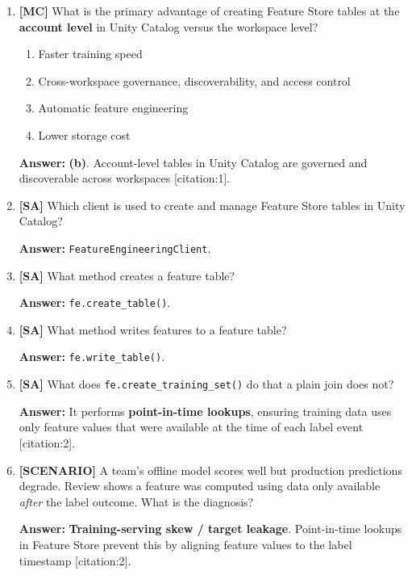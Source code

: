 \documentclass[11pt]{article}
\begin{document}
	\begin{enumerate}[leftmargin=*, label=\textbf{Q\arabic*.}]
		
		\item \textbf{[MC]} What is the primary advantage of creating Feature Store tables at the \textbf{account level} in Unity Catalog versus the workspace level?
		\begin{enumerate}[label=(\alph*)]
			\item Faster training speed
			\item Cross-workspace governance, discoverability, and access control
			\item Automatic feature engineering
			\item Lower storage cost
		\end{enumerate}
		
		\textbf{Answer:} \textbf{(b)}. Account-level tables in Unity Catalog are governed and discoverable across workspaces [citation:1].
		
		\item \textbf{[SA]} Which client is used to create and manage Feature Store tables in Unity Catalog?
		
		\textbf{Answer:} \texttt{FeatureEngineeringClient}.
		
		\item \textbf{[SA]} What method creates a feature table?
		
		\textbf{Answer:} \texttt{fe.create\_table()}.
		
		\item \textbf{[SA]} What method writes features to a feature table?
		
		\textbf{Answer:} \texttt{fe.write\_table()}.
		
		\item \textbf{[SA]} What does \texttt{fe.create\_training\_set()} do that a plain join does not?
		
		\textbf{Answer:} It performs \textbf{point-in-time lookups}, ensuring training data uses only feature values that were available at the time of each label event [citation:2].
		
		\item \textbf{[SCENARIO]} A team's offline model scores well but production predictions degrade. Review shows a feature was computed using data only available \emph{after} the label outcome. What is the diagnosis?
		
		\textbf{Answer:} \textbf{Training-serving skew / target leakage}. Point-in-time lookups in Feature Store prevent this by aligning feature values to the label timestamp [citation:2].
		

\end{enumerate}
\end{document}
